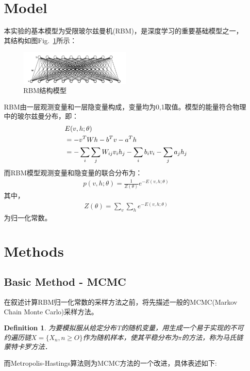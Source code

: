 \documentclass[journal,a4paper]{IEEEtran}
\newtheorem{myDef}{\textbf{Definition}}
\begin{document}
	\section{Model}
	本实验的基本模型为受限玻尔兹曼机(RBM)，是深度学习的重要基础模型之一，其结构如图Fig.~\ref{fig1}所示：

		\begin{figure}[h]
		\centering
		\includegraphics[width=0.5\textwidth]{1.jpg}
		\caption{RBM结构模型}
		\label{fig1}
		\end{figure}
	RBM由一层观测变量和一层隐变量构成，变量均为0,1取值。模型的能量符合物理中的玻尔兹曼分布，即：
		\begin{align}
		 & E(v,h;\theta) \notag \\
		 & =  -v^TWh-b^Tv-a^Th \notag \\
		 & =  -	\sum_{i}{\sum_j{ W_{ij}v_ih_j - \sum_i b_iv_i - \sum_j a_jh_j}}
		\end{align}
	而RBM模型观测变量和隐变量的联合分布为：
		\begin{align}
		p(v,h;\theta) = \frac{1}{Z(\theta)}e^{-E(v,h;\theta)}
		\end{align}
	其中，
		\begin{align}
		Z(\theta) = \sum_{v} \sum_h e^{-E(v,h;\theta)}
		\end{align}
	为归一化常数。

	\section{Methods}
	\subsection{Basic Method - MCMC}

	在叙述计算RBM归一化常数的采样方法之前，将先描述一般的MCMC(Markov Chain Monte Carlo)采样方法。
	\begin{myDef}
		为要模拟服从给定分布T的随机变量，用生成一个易于实现的不可约遍历链$ X=\{X_n,n\geq O\} $作为随机样本，使其平稳分布为$ \pi $的方法，称为马氏链蒙特卡罗方法．
	\end{myDef}
	而Metropolis-Hastings算法则为MCMC方法的一个改进，具体表述如下:
\end{document}
